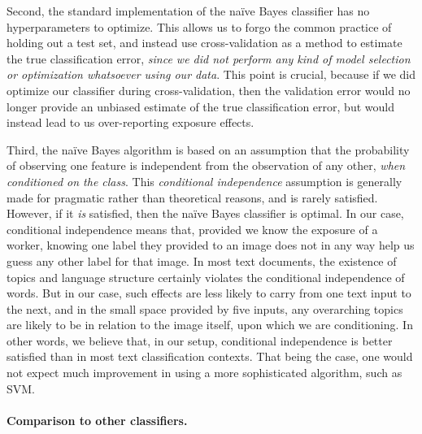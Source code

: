 \documentclass[12pt]{article}
\begin{document}
Second, the standard implementation of the na\"ive Bayes classifier has no 
hyperparameters to optimize.  This allows us to forgo the common practice 
of holding out a test set, and instead use cross-validation as a method to
estimate the true classification error, \textit{since we did not perform
any kind of model selection or optimization whatsoever using our data}.
This point is crucial, because if we did optimize our classifier during 
cross-validation, then the validation error would no longer provide an 
unbiased estimate of the true classification error, but would instead lead
to us over-reporting exposure effects.

Third, the na\"ive Bayes algorithm is based on an assumption that the 
probability of observing one feature is independent from the observation
of any other, \textit{when conditioned on the class}.  This
\textit{conditional independence} assumption is generally made for
pragmatic rather than theoretical reasons, and is rarely satisfied.  However,
if it \textit{is} satisfied, then the na\"ive Bayes classifier is optimal.
In our case, conditional independence means that, provided we know the 
exposure of a worker, knowing one label they provided to an image does
not in any way help us guess any other label for that image.  In most
text documents, the existence of topics and language structure certainly
violates the conditional independence of words.  But in our case, such 
effects are less likely to carry from one text input to the next, and in the
small space provided by five inputs, any overarching topics are likely to
be in relation to the image itself, upon which we are conditioning.  In other
words, we believe that, in our setup, conditional independence is better 
satisfied than in most text classification contexts.  That being the case,
one would not expect much improvement in using a more sophisticated algorithm,
such as SVM.

\paragraph{Comparison to other classifiers.} 
\end{document}
